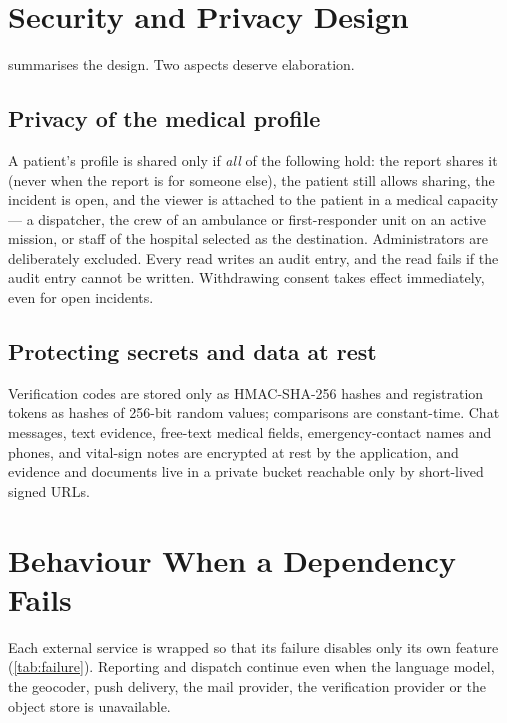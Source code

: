 


\section{Security and Privacy Design}\label{sec:privacy}

 summarises the design. Two aspects deserve elaboration.

\subsection{Privacy of the medical profile}
A patient's profile is shared only if \emph{all} of the following hold: the report shares it (never when the report is for
someone else), the patient still allows sharing, the incident is open, and the viewer is attached to the patient in a
medical capacity --- a dispatcher, the crew of an ambulance or first-responder unit on an active mission, or staff of
the hospital selected as the destination. Administrators are deliberately excluded. Every read writes an audit entry,
and the read fails if the audit entry cannot be written. Withdrawing consent takes effect immediately, even for open
incidents.

\subsection{Protecting secrets and data at rest}
Verification codes are stored only as HMAC-SHA-256 hashes and registration tokens as hashes of 256-bit random values;
comparisons are constant-time. Chat messages, text evidence, free-text medical fields, emergency-contact names and
phones, and vital-sign notes are encrypted at rest by the application, and evidence and documents live in a private
bucket reachable only by short-lived signed URLs.



\section{Behaviour When a Dependency Fails}\label{sec:failure}

Each external service is wrapped so that its failure disables only its own feature (\cref{tab:failure}). Reporting and
dispatch continue even when the language model, the geocoder, push delivery, the mail provider, the verification provider
or the object store is unavailable.

